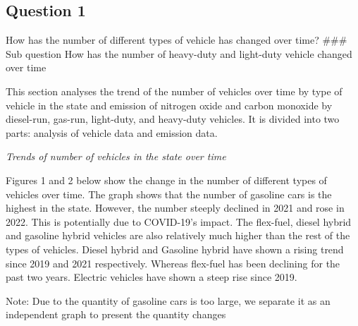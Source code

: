 \documentclass[
  12pt,
]{article}
\begin{document}
\hypertarget{question-1}{%
\subsection{Question 1}\label{question-1}}

How has the number of different types of vehicle has changed over time?
\#\#\# Sub question How has the number of heavy-duty and light-duty
vehicle changed over time

This section analyses the trend of the number of vehicles over time by
type of vehicle in the state and emission of nitrogen oxide and carbon
monoxide by diesel-run, gas-run, light-duty, and heavy-duty vehicles. It
is divided into two parts: analysis of vehicle data and emission data.

\emph{Trends of number of vehicles in the state over time}

Figures 1 and 2 below show the change in the number of different types
of vehicles over time. The graph shows that the number of gasoline cars
is the highest in the state. However, the number steeply declined in
2021 and rose in 2022. This is potentially due to COVID-19's impact. The
flex-fuel, diesel hybrid and gasoline hybrid vehicles are also
relatively much higher than the rest of the types of vehicles. Diesel
hybrid and Gasoline hybrid have shown a rising trend since 2019 and 2021
respectively. Whereas flex-fuel has been declining for the past two
years. Electric vehicles have shown a steep rise since 2019.

Note: Due to the quantity of gasoline cars is too large, we separate it
as an independent graph to present the quantity changes
\end{document}
